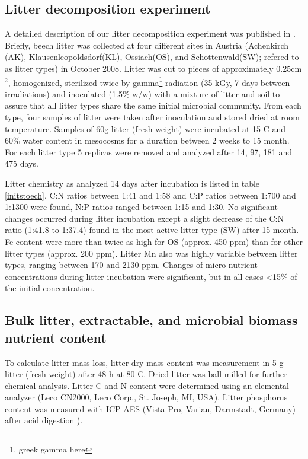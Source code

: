 \documentclass[authoryear,preprint,review,12pt]{elsarticle}
\begin{document}
\subsection{Litter decomposition experiment}
A detailed description of our litter decomposition experiment was published in \cite{Wanek2010}. Briefly, beech litter was collected at four different sites in Austria (Achenkirch (AK), Klausenleopoldsdorf(KL), Ossiach(OS), and Schottenwald(SW); refered to as litter types) in October 2008. Litter was cut to pieces of approximately 0.25cm$^2$, homogenized, sterilized twice by gamma\footnote{greek gamma here} radiation (35 kGy, 7 days between irradiations) and inoculated (1.5\% w/w) with a mixture of litter and soil to assure that all litter types share the same initial microbial community. From each type, four samples of litter were taken after inoculation and stored dried at room temperature. Samples of 60g litter (fresh weight) were incubated at 15 \textdegree C and 60\% water content in mesocosms for a duration between 2 weeks to 15 month. For each litter type 5 replicas were removed and analyzed after 14, 97, 181 and 475 days.

Litter chemistry as analyzed 14 days after incubation is listed in table \ref{initstoech}. C:N ratios between 1:41 and 1:58 and C:P ratios between 1:700 and 1:1300 were found, N:P ratios ranged between 1:15 and 1:30. No significant changes occurred during litter incubation except a slight decrease of the C:N ratio (1:41.8 to 1:37.4) found in the most active litter type (SW) after 15 month. Fe content were more than twice as high for OS (approx. 450 ppm) than for other litter types (approx. 200 ppm). Litter Mn also was highly variable between litter types, ranging between 170 and 2130 ppm. Changes of micro-nutrient concentrations during litter incubation were significant, but in all cases \textless 15\% of the initial concentration.

\subsection{Bulk litter, extractable, and microbial biomass nutrient content}
To calculate litter mass loss, litter dry mass content was measurement in 5 g litter (fresh weight) after 48 h at 80 \textdegree C. Dried litter was ball-milled for further chemical analysis. Litter C and N content were determined using an elemental analyzer (Leco CN2000, Leco Corp., St. Joseph, MI, USA). Litter phosphorus content was measured with ICP-AES (Vista-Pro, Varian, Darmstadt, Germany) after acid digestion \cite{Henschler1988}).
\end{document}
